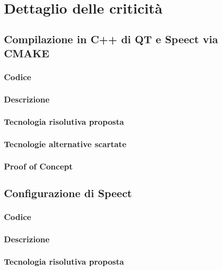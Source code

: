 \documentclass[./../Technology Baseline.tex]{subfiles}
\begin{document}
\section{Dettaglio delle criticità}

\subsection{Compilazione in C++ di QT e Speect via CMAKE}

\subsubsection{Codice}

\subsubsection{Descrizione}

\subsubsection{Tecnologia risolutiva proposta}

\subsubsection{Tecnologie alternative scartate}

\subsubsection{Proof of Concept}

\subsection{Configurazione di Speect}

\subsubsection{Codice}

\subsubsection{Descrizione}

\subsubsection{Tecnologia risolutiva proposta}
\end{document}
